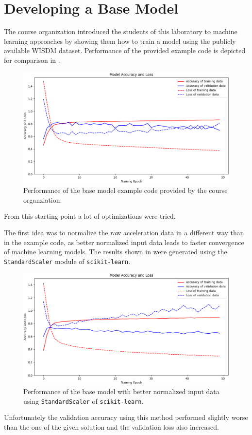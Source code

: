 \section{Developing a Base Model}
\label{sec:baseModel}
The course organization introduced the students of this laboratory to machine learning approaches by showing them how to train a model using the publicly available WISDM dataset\autocite{wisdm:dataset}. Performance of the provided example code is depicted for comparison in .
\begin{figure}[htpb]
\centering
\includegraphics[width=\linewidth]{PlainGithub}
\caption{Performance of the base model example code provided by the course organziation.}
\label{myfig:PlainGithub}
\end{figure}
From this starting point a lot of optimizations were tried.

The first idea was to normalize the raw acceleration data in a different way than in the example code, as better normalized input data leads to faster convergence of machine learning models\autocite{Medium:Normalization}. The results shown in  were generated using the \texttt{StandardScaler} module of \texttt{scikit-learn}\autocite{scikit:learn}.
\begin{figure}[htpb]
\centering
\includegraphics[width=\linewidth]{StdScaler}
\caption{Performance of the base model with better normalized input data using \texttt{StandardScaler} of \texttt{scikit-learn}.}
\label{myfig:StdScaler}
\end{figure}
Unfortunately the validation accuracy using this method performed slightly worse than the one of the given solution and the validation loss also increased.

